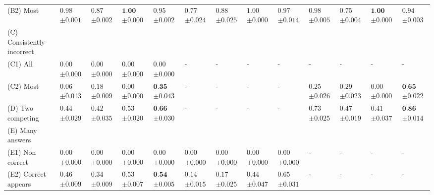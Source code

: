 \begin{table}[t]
{\begin{tabular}{l|llll|llll|llll}
         \hspace{1em} (B2) Most &  $0.98$ \tiny $\pm 0.001$ & $0.87$ \tiny $\pm 0.002$ & $\textbf{1.00}$ \tiny $\pm 0.000$ & $0.95$ \tiny $\pm 0.002$ & $0.77$ \tiny $\pm 0.024$ & $0.88$ \tiny $\pm 0.025$ & $1.00$ \tiny $\pm 0.000$ & $0.97$ \tiny $\pm 0.014$ & $0.98$ \tiny $\pm 0.005$ & $0.75$ \tiny $\pm 0.004$ & $\textbf{1.00}$ \tiny $\pm 0.000$ & $0.94$ \tiny $\pm 0.003$ \\
         (C) Consistently incorrect \\
         \hspace{1em} (C1) All & $0.00$ \tiny $\pm 0.000$ & $0.00$ \tiny $\pm 0.000$ & $0.00$ \tiny $\pm 0.000$ & $0.00$ \tiny $\pm 0.000$  & - & - & - & - & - & - & - & - \\
         \hspace{1em} (C2) Most & $0.06$ \tiny $\pm 0.013$ & $0.18$ \tiny $\pm 0.009$ & $0.00$ \tiny $\pm 0.000$ & $\textbf{0.35}$ \tiny $\pm 0.043$  & - & - & - & - & $0.25$ \tiny $\pm 0.026$ & $0.29$ \tiny $\pm 0.023$ & $0.00$ \tiny $\pm 0.000$ & $\textbf{0.65}$ \tiny $\pm 0.022$ \\
         (D) Two competing & $0.44$ \tiny $\pm 0.029$ & $0.42$ \tiny $\pm 0.035$ & $0.53$ \tiny $\pm 0.020$ & $\textbf{0.66}$ \tiny $\pm 0.030$  & - & - & - & -  & $0.73$ \tiny $\pm 0.025$ & $0.47$ \tiny $\pm 0.019$ & $0.41$ \tiny $\pm 0.037$ & $\textbf{0.86}$ \tiny $\pm 0.014$ \\
         (E) Many answers \\
         \hspace{1em} (E1) Non correct & $0.00$ \tiny $\pm 0.000$ & $0.00$ \tiny $\pm 0.000$ & $0.00$ \tiny $\pm 0.000$ & $0.00$ \tiny $\pm 0.000$ & $0.00$ \tiny $\pm 0.000$ & $0.00$ \tiny $\pm 0.000$ & $0.00$ \tiny $\pm 0.000$ & $0.00$ \tiny $\pm 0.000$ & - & - & - & - \\
         \hspace{1em} (E2) Correct appears & $0.46$ \tiny $\pm 0.009$ & $0.34$ \tiny $\pm 0.009$ & $0.53$ \tiny $\pm 0.007$ & $\textbf{0.54}$ \tiny $\pm 0.005$ & $0.14$ \tiny $\pm 0.015$ & $0.17$ \tiny $\pm 0.025$ & $0.44$ \tiny $\pm 0.047$ & $0.65$ \tiny $\pm 0.031$ & - & - & - & - \\
    \bottomrule
    \end{tabular}
    }
    \label{tab:performance_after_probing_appendix_non_instruct}
\end{table}
